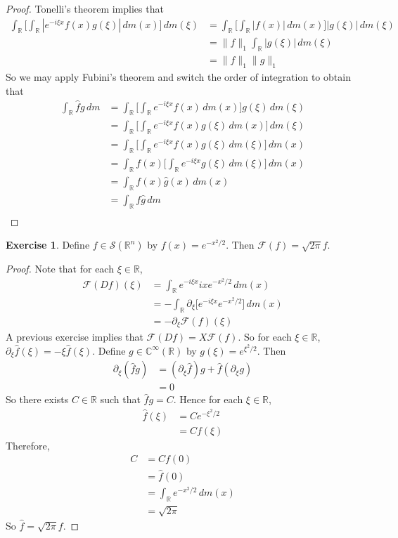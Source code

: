 \documentclass[12pt]{amsart}
\theoremstyle{definition}
\newtheorem{ex}[definition]{Exercise}
\newcommand{\p}{\partial}
\newcommand{\C}{\mathbb{C}}
\newcommand{\R}{\mathbb{R}}
\newcommand{\MF}{\mathcal{F}}
\newcommand{\MS}{\mathcal{S}}
\newcommand{\dm}{\, d m}
\begin{document}
	\begin{proof}
		Tonelli's theorem implies that  
		\begin{align*}
			\int_{\R} \bigg[ \int_{\R}|e^{-i \xi x} f(x) g(\xi)| \dm(x) \bigg] \dm(\xi)
			& = \int_{\R} \bigg[ \int_{\R}|f(x)| \dm(x) \bigg]  |g(\xi)| \dm(\xi) \\
			& = \|f\|_1 \int_{\R}  |g(\xi)| \dm(\xi) \\
			& = \|f\|_1\|g\|_1
		\end{align*}  
		So we may apply Fubini's theorem and switch the order of integration to obtain that
		\begin{align*}
			\int_{\R}\hat{f} g \dm 
			& = \int_{\R} \bigg[ \int_{\R}e^{-i \xi x} f(x) \dm(x) \bigg]  g(\xi) \dm(\xi) \\
			& = \int_{\R} \bigg[ \int_{\R}e^{-i \xi x} f(x) g(\xi) \dm(x) \bigg] \dm(\xi) \\
			& = \int_{\R} \bigg[ \int_{\R}e^{-i \xi x} f(x) g(\xi) \dm(\xi) \bigg] \dm(x) \\
			& = \int_{\R} f(x) \bigg[ \int_{\R}e^{-i \xi x}  g(\xi) \dm(\xi) \bigg] \dm(x) \\
			& = \int_{\R} f(x) \hat{g}(x) \dm(x) \\
			& = \int_{\R} f \hat{g} \dm \\
		\end{align*}
	\end{proof}


	\begin{ex}
		Define $f \in \MS(\R^n)$ by $f(x) = e^{-x^2/2}$. Then $\MF(f) = \sqrt{2 \pi}f$.
	\end{ex}

	\begin{proof}
		Note that for each $\xi \in \R$, 
		\begin{align*}
			\MF(Df)(\xi) 
			& = \int_{\R} e^{-i \xi x}ixe^{-x^2/2} \dm(x) \\
			& = -\int_{\R}  \p_{\xi} \bigg[ e^{-i \xi x} e^{-x^2/2}\bigg] \dm(x) \\
			& = - \p_{\xi} \MF(f)(\xi) 
		\end{align*}
		A previous exercise implies that $\MF(Df) = X \MF(f)$. So for each $\xi \in \R$, $\p_{\xi} \hat{f}(\xi) = - \xi \hat{f}(\xi)$. Define $g \in \C^{\infty}(\R)$ by $g(\xi) = e^{\xi^2/2}$. Then 
		\begin{align*}
			\p_{\xi} (\hat{f} g) 
			& = (\p_{\xi} \hat{f}) g + \hat{f} (\p_{\xi}g) \\
			& = 0
		\end{align*}
		So there exists $C \in \R$ such that $\hat{f}g = C$. Hence for each $\xi \in \R$, 
		\begin{align*}
			\hat{f}(\xi) 
			& = Ce^{-\xi^2/2} \\
			& = Cf(\xi)
		\end{align*}
		Therefore, 
		\begin{align*}
			C
			& = Cf(0) \\
			& = \hat{f}(0) \\
			& = \int_{\R} e^{-x^2/2} \dm(x) \\
			& = \sqrt{2 \pi} 
		\end{align*}
		So $\hat{f} = \sqrt{2 \pi}f$.
	\end{proof}
\end{document}
